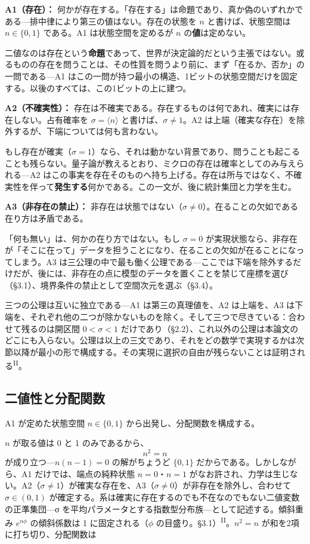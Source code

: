 \documentclass[fontsize=11pt,paper=a4,lualatex]{jlreq}
\newcommand{\PII}{\textsuperscript{\textup{II}}}
\begin{document}
\textbf{A1（存在）：} 何かが存在する。「存在する」は命題であり、真か偽のいずれかである---排中律により第三の値はない。存在の状態を $n$ と書けば、状態空間は $n \in \{0,1\}$ である。A1 は状態空間を定めるが $n$ の\textbf{値}は定めない。

二値なのは存在という\textbf{命題}であって、世界が決定論的だという主張ではない。或るものの存在を問うことは、その性質を問うより前に、まず「在るか、否か」の一問である---A1 はこの一問が持つ最小の構造、1ビットの状態空間だけを固定する。以後のすべては、この1ビットの上に建つ。

\textbf{A2（不確実性）：} 存在は不確実である。存在するものは何であれ、確実には存在しない。占有確率を $\sigma = \langle n \rangle$ と書けば、$\sigma \neq 1$。A2 は上端（確実な存在）を除外するが、下端については何も言わない。

もし存在が確実（$\sigma = 1$）なら、それは動かない背景であり、問うことも起こることも残らない。量子論が教えるとおり、ミクロの存在は確率としてのみ与えられる---A2 はこの事実を存在そのものへ持ち上げる。存在は所与ではなく、不確実性を伴って\textbf{発生する}何かである。この一文が、後に統計集団と力学を生む。

\textbf{A3（非存在の禁止）：} 非存在は状態ではない（$\sigma \neq 0$）。在ることの欠如である在り方は矛盾である。

「何も無い」は、何かの在り方ではない。もし $\sigma = 0$ が実現状態なら、非存在が「そこに在って」データを担うことになり、在ることの欠如が在ることになってしまう。A3 は三公理の中で最も働く公理である---ここでは下端を除外するだけだが、後には、非存在の点に模型のデータを置くことを禁じて座標を選び（§3.1）、境界条件の禁止として空間次元を選ぶ（§3.4）。

三つの公理は互いに独立である---A1 は第三の真理値を、A2 は上端を、A3 は下端を、それぞれ他の二つが除かないものを除く。そして三つで尽きている：合わせて残るのは開区間 $0 < \sigma < 1$ だけであり（§2.2）、これ以外の公理は本論文のどこにも入らない。公理は以上の三文であり、それをどの数学で実現するかは次節以降が最小の形で構成する。その実現に選択の自由が残らないことは証明される\PII{}。

\subsection{二値性と分配関数}\label{ux4e8cux5024ux6027}

A1 が定めた状態空間 $n \in \{0,1\}$ から出発し、分配関数を構成する。

$n$ が取る値は 0 と 1 のみであるから、
\[
  n^2 = n
\]
が成り立つ---$n(n{-}1) = 0$ の解がちょうど $\{0,1\}$ だからである。しかしながら、A1 だけでは、端点の純粋状態 $n = 0$・$n = 1$ がなお許され、力学は生じない。A2（$\sigma \neq 1$）が確実な存在を、A3（$\sigma \neq 0$）が非存在を除外し、合わせて $\sigma \in (0,1)$ が確定する。系は確実に存在するのでも不在なのでもない二値変数の正準集団---σ を平均パラメータとする指数型分布族---として記述する。傾斜重み $e^{n\phi}$ の傾斜係数は 1 に固定される（$\phi$ の目盛り。§3.1）\PII{}。$n^2 = n$ が和を2項に打ち切り、分配関数は
\end{document}
